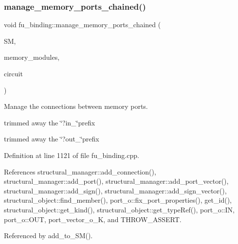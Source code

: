 \subsubsection{\texorpdfstring{manage\+\_\+memory\+\_\+ports\+\_\+chained()}{manage\_memory\_ports\_chained()}}
{\footnotesize\ttfamily void fu\+\_\+binding\+::manage\+\_\+memory\+\_\+ports\+\_\+chained (\begin{DoxyParamCaption}\item[{const \hyperlink{structural__manager_8hpp_ab3136f0e785d8535f8d252a7b53db5b5}{structural\+\_\+manager\+Ref}}]{SM,  }\item[{const std\+::list$<$ \hyperlink{structural__objects_8hpp_a8ea5f8cc50ab8f4c31e2751074ff60b2}{structural\+\_\+object\+Ref} $>$ \&}]{memory\+\_\+modules,  }\item[{const \hyperlink{structural__objects_8hpp_a8ea5f8cc50ab8f4c31e2751074ff60b2}{structural\+\_\+object\+Ref}}]{circuit }\end{DoxyParamCaption})\hspace{0.3cm}{\ttfamily [static]}}



Manage the connections between memory ports. 

trimmed away the \char`\"{}?in\+\_\+\char`\"{}prefix

trimmed away the \char`\"{}?out\+\_\+\char`\"{}prefix 

Definition at line 1121 of file fu\+\_\+binding.\+cpp.



References structural\+\_\+manager\+::add\+\_\+connection(), structural\+\_\+manager\+::add\+\_\+port(), structural\+\_\+manager\+::add\+\_\+port\+\_\+vector(), structural\+\_\+manager\+::add\+\_\+sign(), structural\+\_\+manager\+::add\+\_\+sign\+\_\+vector(), structural\+\_\+object\+::find\+\_\+member(), port\+\_\+o\+::fix\+\_\+port\+\_\+properties(), get\+\_\+id(), structural\+\_\+object\+::get\+\_\+kind(), structural\+\_\+object\+::get\+\_\+type\+Ref(), port\+\_\+o\+::\+IN, port\+\_\+o\+::\+O\+UT, port\+\_\+vector\+\_\+o\+\_\+K, and T\+H\+R\+O\+W\+\_\+\+A\+S\+S\+E\+RT.



Referenced by add\+\_\+to\+\_\+\+S\+M().

